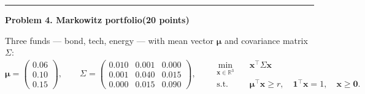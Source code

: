 \documentclass[10pt]{article}
\newcommand{\problem}[2]{%
  \par\bigskip
  {\color{ruleink}\rule{\textwidth}{1pt}}\par\nobreak\vspace{3pt}
  {\large\bfseries #2}\hfill{\normalsize\bfseries(#1 points)}\par\nobreak\vspace{4pt}}
\begin{document}
\problem{20}{Problem 4. Markowitz portfolio}

Three funds --- bond, tech, energy --- with mean vector $\bm{\mu}$ and covariance matrix
$\Sigma$:
\[
  \bm{\mu} = \begin{pmatrix} 0.06 \\ 0.10 \\ 0.15 \end{pmatrix},
  \qquad
  \Sigma = \begin{pmatrix}
    0.010 & 0.001 & 0.000 \\
    0.001 & 0.040 & 0.015 \\
    0.000 & 0.015 & 0.090
  \end{pmatrix},
  \qquad
  \begin{aligned}
    \min_{\bm{x} \in \mathbb{R}^3} \quad & \bm{x}^{\top}\Sigma \bm{x} \\
    \text{s.t.} \quad & \bm{\mu}^{\top}\bm{x} \ge r, \quad \mathbf{1}^{\top}\bm{x} = 1, \quad \bm{x} \ge \bm{0} .
  \end{aligned}
\]
\end{document}
